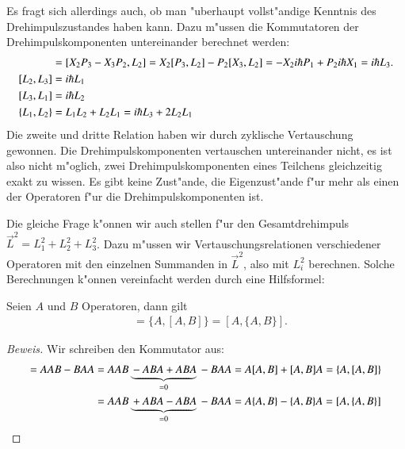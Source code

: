 Es fragt sich allerdings auch, ob man "uberhaupt vollst"andige Kenntnis
des Drehimpulszustandes haben kann.
Dazu m"ussen die Kommutatoren der Drehimpulskomponenten untereinander
berechnet werden:
\begin{align}
[L_1,L_2]
&=
[X_2P_3-X_3P_2,L_2]
=
X_2[P_3,L_2]-P_2[X_3,L_2]
=
-X_2i\hbar P_1+P_2i\hbar X_1
=
i\hbar L_3.
\label{skript:drehimpulskommutator}
\\
[L_2,L_3]&=i\hbar L_1
\notag
\\
[L_3,L_1]&=i\hbar L_2
\notag
\\
\{L_1,L_2\}
&=
L_1L_2+L_2L_1=i\hbar L_3+2L_2L_1
\label{skript:drehimpulsantikommutator}
\end{align}
Die zweite und dritte Relation haben wir durch zyklische Vertauschung
gewonnen.
Die Drehimpulskomponenten vertauschen untereinander nicht, es ist also
nicht m"oglich, zwei Drehimpulskomponenten eines Teilchens
gleichzeitig exakt zu wissen.
Es gibt keine Zust"ande, die Eigenzust"ande f"ur mehr als einen
der Operatoren f"ur die Drehimpulskomponenten ist.

Die gleiche Frage k"onnen wir auch stellen f"ur den Gesamtdrehimpuls
$\vec L^2=L_1^2+L_2^2+L_3^2$. Dazu m"ussen wir Vertauschungsrelationen
verschiedener Operatoren mit den einzelnen Summanden in $\vec L^2$, also
mit $L_i^2$ berechnen.
Solche Berechnungen k"onnen vereinfacht werden durch eine Hilfsformel:

\begin{hilfssatz}
\label{skript:commutatora2b}
Seien $A$ und $B$ Operatoren, dann gilt
\begin{align*}
[A^2,B]
&=
\{A,[A,B]\}
=
[A,\{A,B\}].
\end{align*}
\end{hilfssatz}

\begin{proof}[Beweis]
Wir schreiben den Kommutator aus:
\begin{align*}
[A^2,B]
=
AAB-BAA
&=
AAB\underbrace{\mathstrut -ABA+ABA}_{=0}\mathstrut -BAA
=
A[A,B]+[A,B]A
=
\{A,[A,B]\}
\\
&=
AAB\underbrace{\mathstrut +ABA-ABA}_{=0}\mathstrut -BAA
=
A\{A,B\}-\{A,B\}A
=
[A,\{A,B\}]
\end{align*}
\end{proof}

